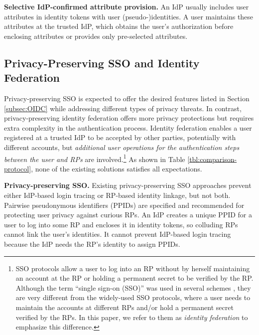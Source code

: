 
\noindent\textbf{Selective IdP-confirmed attribute provision.}
An IdP usually includes user attributes in identity tokens \cite{OpenIDConnect,rfc6749} with user (pseudo-)identities.
A user maintains these attributes at the trusted IdP,
which obtains the user's authorization before enclosing attributes or provides only pre-selected attributes.

\subsection{Privacy-Preserving SSO and Identity Federation}
\label{subsec-solutions}

\newc
Privacy-preserving SSO is expected to offer the desired features listed in Section \ref{subsec:OIDC} while addressing different types of privacy threats. In contrast, privacy-preserving identity federation offers more privacy protections but requires extra complexity in the authentication process.
Identity federation enables a user registered at a trusted IdP to be accepted by other parties, potentially with different accounts,
but \emph{additional user operations for the authentication steps between the user and RPs} are involved.\footnote{\newc SSO protocols \cite{OpenIDConnect,rfc6749, SAML, SAMLIdentifier} allow a user to log into an RP without by herself maintaining an account at the RP or holding a permanent secret to be verified by the RP. Although the term ``single sign-on (SSO)'' was used in several schemes \cite{PseudoID, Opaak, ELPASSO, WangWS13, HanCSTW18, HanCSTWW20}, they are very different from the widely-used SSO protocols, where a user needs to maintain the accounts at different RPs and/or hold a permanent secret verified by the RPs. In this paper, we refer to them as \emph{identity federation} to emphasize this difference.}
As shown in Table \ref{tbl:comparison-protocol}, none of the existing solutions satisfies all expectations.


\noindent\textbf{Privacy-preserving SSO.}
Existing privacy-preserving SSO approaches \cite{BrowserID, SPRESSO, NIST2017draft} prevent either IdP-based login tracing or RP-based identity linkage, but not both.
\oldc
Pairwise pseudonymous identifiers (PPIDs) are specified \cite{OpenIDConnect, SAMLIdentifier} and recommended \cite{NIST2017draft}
for protecting user privacy against curious RPs. An IdP creates a unique PPID for a user to log into some RP and encloses it in identity tokens, so colluding RPs cannot link the user's identities.
It cannot prevent IdP-based login tracing because the IdP needs the RP's identity to assign PPIDs.


